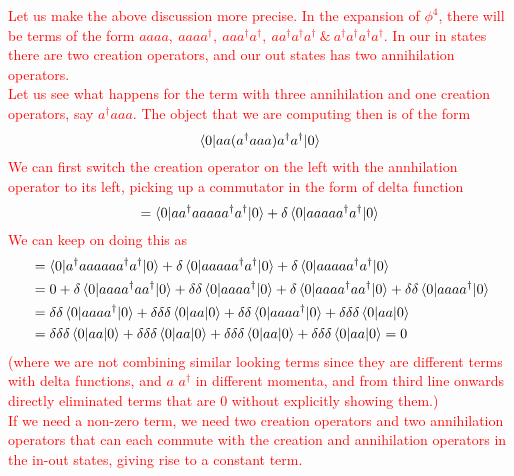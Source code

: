 \documentclass[11pt]{article}
\newcommand{\adag}[1]{a^\dagger_\mathbf{#1}}
\numberwithin{equation}{section}
\begin{document}
    \textcolor{red}{
        Let us make the above discussion more precise. 
        In the expansion of \(\phi^4\), there will be terms of the form \(aaaa,~aaaa^\dagger,~ aaa^\dagger a^\dagger,~ aa^\dagger a^\dagger a^\dagger~\&~a^\dagger a^\dagger a^\dagger a^\dagger\). In our in states there are two creation operators, and our out states has two annihilation operators. \\
        Let us see what happens for the term with three annihilation and one creation operators, say \(a^\dagger a a a\).  The object that we are computing then is of the form 
        \begin{equation*}
            \braket{0|aa(a^\dagger aaa)a^\dagger a^\dagger |0}
        \end{equation*}
        We can first switch the creation operator on the left with the annhilation operator to its left, picking up a commutator in the form of delta function 
        \begin{equation*}
            = \braket{0|aa^\dagger aaaaa^\dagger a^\dagger |0} + \delta \braket{0|aaaaa^\dagger a^\dagger |0}
        \end{equation*}
        We can keep on doing this as 
        \begin{align*}
            &= \braket{0|a^\dagger aaaaaa^\dagger a^\dagger |0} + \delta\braket{0|aaaaa^\dagger a^\dagger |0}  + \delta \braket{0|aaaaa^\dagger a^\dagger |0}\\ 
            &= 0 + \delta\braket{0|aaaa^\dagger a a^\dagger |0} + \delta\delta \braket{0|aaa a^\dagger |0}  + \delta\braket{0|aaaa^\dagger a a^\dagger |0} + \delta\delta \braket{0|aaa a^\dagger |0} \\
            & = \delta\delta\braket{0|aaaa^\dagger|0} + \delta\delta\delta \braket{0|aa|0}  + \delta\delta\braket{0|aaaa^\dagger|0} + \delta\delta\delta \braket{0|aa|0}  \\
            & = \delta\delta\delta \braket{0|aa|0} + \delta\delta\delta \braket{0|aa|0}+\delta\delta\delta \braket{0|aa|0}+\delta\delta\delta \braket{0|aa|0} = 0
        \end{align*}
        (where we are not combining similar looking terms since they are different terms with delta functions, and \(a\) \(\adag{~}\) in different momenta, and from third line onwards directly eliminated terms that are 0 without explicitly showing them.)\\
        If we need a non-zero term, we need two creation operators and two annihilation operators that can each commute with the creation and annihilation operators in the in-out states, giving rise to a constant term. \\
}
\end{document}
